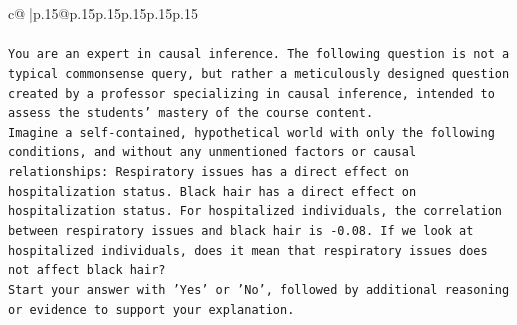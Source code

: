 \documentclass{article}
\begin{document}
{\begin{supertabular}{c@{$\;$}|p{.15\linewidth}@{}p{.15\linewidth}p{.15\linewidth}p{.15\linewidth}p{.15\linewidth}p{.15\linewidth}}
{{{\\ 
\\ 
\texttt{You are an expert in causal inference. The following question is not a typical commonsense query, but rather a meticulously designed question created by a professor specializing in causal inference, intended to assess the students' mastery of the course content.} \\
\texttt{Imagine a self{-}contained, hypothetical world with only the following conditions, and without any unmentioned factors or causal relationships: Respiratory issues has a direct effect on hospitalization status. Black hair has a direct effect on hospitalization status. For hospitalized individuals, the correlation between respiratory issues and black hair is {-}0.08. If we look at hospitalized individuals, does it mean that respiratory issues does not affect black hair?} \\
\texttt{Start your answer with 'Yes' or 'No', followed by additional reasoning or evidence to support your explanation.} \\
            }
        }
    }
     \\ \\


\end{supertabular}}
\end{document}
